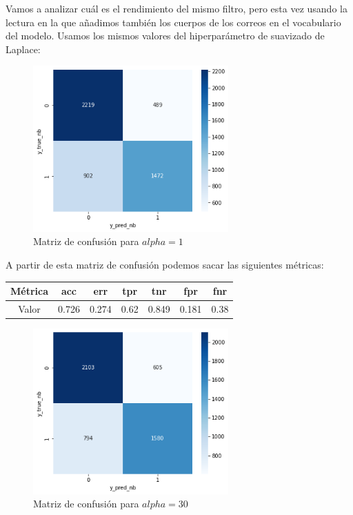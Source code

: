\documentclass[conference,a4paper]{IEEEtran}
\begin{document}
Vamos a analizar cuál es el rendimiento del mismo filtro, pero esta vez usando la lectura en la que añadimos también los cuerpos de los correos en el vocabulario del modelo. Usamos los mismos valores del hiperparámetro de suavizado de Laplace: \\

\begin{figure}[h]
  \centering
  \includegraphics[width=75mm]{nb_body_1}
  \caption{Matriz de confusión para $alpha=1$}
  \label{fig:ejemplo}
\end{figure}

A partir de esta matriz de confusión podemos sacar las siguientes métricas:

\begin{center}
\begin{tabular}[h]{ |c|c|c|c|c|c|c| } 
 \hline
 Métrica & acc & err & tpr & tnr & fpr & fnr \\ 
 \hline
 Valor & 0.726 & 0.274 & 0.62 & 0.849 & 0.181 & 0.38 \\ 
 \hline
\end{tabular}
\end{center}

\begin{figure}[h]
  \centering
  \includegraphics[width=75mm]{nb_body_30}
  \caption{Matriz de confusión para $alpha=30$}
  \label{fig:ejemplo}
\end{figure}
\end{document}
